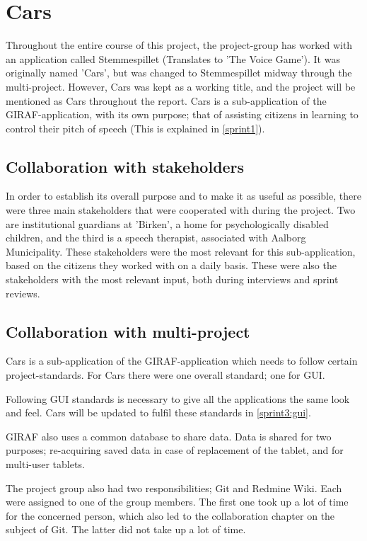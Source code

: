 \section{Cars}
Throughout the entire course of this project, the project-group has worked with an application called Stemmespillet (Translates to 'The Voice Game').
It was originally named 'Cars', but was changed to Stemmespillet midway through the multi-project.
However, Cars was kept as a working title, and the project will be mentioned as Cars throughout the report.
Cars is a sub-application of the GIRAF-application, with its own purpose; that of assisting citizens in learning to control their pitch of speech (This is explained in \cref{sprint1}).

\subsection{Collaboration with stakeholders}
In order to establish its overall purpose and to make it as useful as possible, there were three main stakeholders that were cooperated with during the project.
Two are institutional guardians at 'Birken', a home for psychologically disabled children, and the third is a speech therapist, associated with Aalborg Municipality.
These stakeholders were the most relevant for this sub-application, based on the citizens they worked with on a daily basis.
These were also the stakeholders with the most relevant input, both during interviews and sprint reviews.

\subsection{Collaboration with multi-project}
Cars is a sub-application of the GIRAF-application which needs to follow certain project-standards.
For Cars there were one overall standard; one for GUI.

Following GUI standards is necessary to give all the applications the same look and feel.
Cars will be updated to fulfil these standards in \cref{sprint3:gui}.

GIRAF also uses a common database to share data.
Data is shared for two purposes; re-acquiring saved data in case of replacement of the tablet, and for multi-user tablets.

The project group also had two responsibilities; Git and Redmine Wiki.
Each were assigned to one of the group members.
The first one took up a lot of time for the concerned person, which also led to the collaboration chapter on the subject of Git.
The latter did not take up a lot of time.

